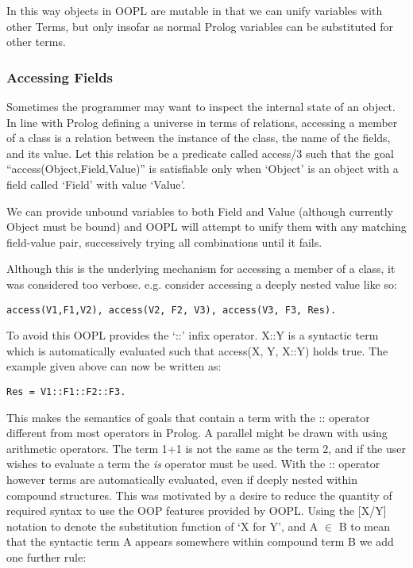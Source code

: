 \documentclass[12pt,a4paper,twoside,openright]{report}
\begin{document}
\bigskip

In this way objects in OOPL are mutable in that we can unify variables with other Terms, but only insofar as normal Prolog variables can be substituted for other terms. 

\subsubsection{Accessing Fields}

Sometimes the programmer may want to inspect the internal state of an object. In line with Prolog defining a universe in terms of relations, accessing a member of a class is a relation between the instance of the class, the name of the fields, and its value. Let this relation be a predicate called access/3 such that the goal ``access(Object,Field,Value)'' is satisfiable only when `Object' is an object with a field called `Field' with value `Value'.

\bigskip

We can provide unbound variables to both Field and Value (although currently Object must be bound) and OOPL will attempt to unify them with any matching field-value pair, successively trying all combinations until it fails. 

\bigskip
Although this is the underlying mechanism for accessing a member of a class, it was considered too verbose. e.g. consider accessing a deeply nested value like so: 
\begin{lstlisting}
access(V1,F1,V2), access(V2, F2, V3), access(V3, F3, Res).
\end{lstlisting}
To avoid this OOPL provides the `::' infix operator. X::Y is a syntactic term which is automatically evaluated such that access(X, Y, X::Y) holds true. The example given above can now be written as:
\begin{lstlisting}
Res = V1::F1::F2::F3.
\end{lstlisting}

\bigskip

This makes the semantics of goals that contain a term with the :: operator different from most operators in Prolog. A parallel might be drawn with using arithmetic operators. The term 1+1 is not the same as the term 2, and if the user wishes to evaluate a term the \emph{is} operator must be used. With the :: operator however terms are automatically evaluated, even if deeply nested within compound structures. This was motivated by a desire to reduce the quantity of required syntax to use the OOP features provided by OOPL. Using the [X/Y] notation to denote the substitution function of `X for Y', and A $\in$ B to mean that the syntactic term A appears somewhere within compound term B we add one further rule:
\end{document}
